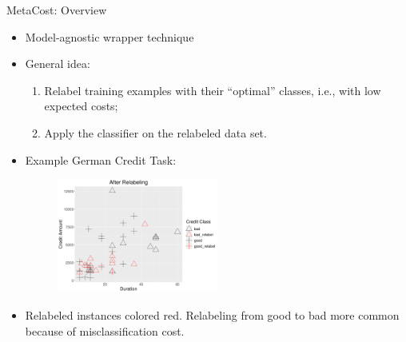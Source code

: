 \documentclass[11pt,compress,t,notes=noshow, xcolor=table]{beamer}
\begin{document}
\begin{vbframe}{MetaCost: Overview}

        \begin{itemize}
        \small
            \item Model-agnostic wrapper technique                      
            \item General idea: 
                \begin{enumerate}
                \small
                    \item Relabel training examples with their ``optimal'' classes, i.e., with low expected costs;
                   
                    \item Apply the classifier on the relabeled data set.
                \end{enumerate} 
                \item Example German Credit Task:
                                \begin{figure}[h]
            \centering
            \includegraphics[width=0.5\textwidth]{figure_man/Relabeling_viz.png}
        \end{figure}
                \item Relabeled instances colored red. Relabeling from good to bad more common because of misclassification cost.
        \end{itemize}

\end{vbframe}
\end{document}
